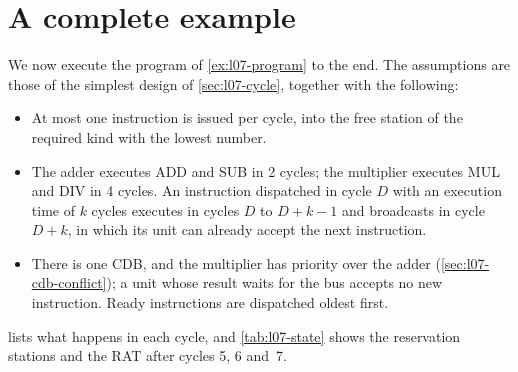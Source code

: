 \documentclass[../main.tex]{subfiles}
\begin{document}
\section{A complete example}
\label{sec:l07-example}

We now execute the program of \cref{ex:l07-program} to the
end.  The assumptions are those of
the simplest design of \cref{sec:l07-cycle}, together with the following:
\begin{itemize}
  \item At most one instruction is issued per cycle, into the free station of
    the required kind with the lowest number.
  \item The adder executes ADD and SUB in 2 cycles; the multiplier executes
    MUL and DIV in 4 cycles.  An instruction
    dispatched in cycle $D$ with an execution time of $k$ cycles executes in
    cycles $D$ to $D+k-1$ and broadcasts in cycle $D+k$, in which its unit
    can already accept the next instruction.
  \item There is one CDB, and the multiplier has priority over the adder
    (\cref{sec:l07-cdb-conflict}); a unit whose result waits for the bus
    accepts no new instruction.  Ready instructions are dispatched oldest
    first.
\end{itemize}
 lists what happens in each cycle, and
\cref{tab:l07-state} shows the reservation stations and the RAT after cycles
5, 6 and~7.
\end{document}
